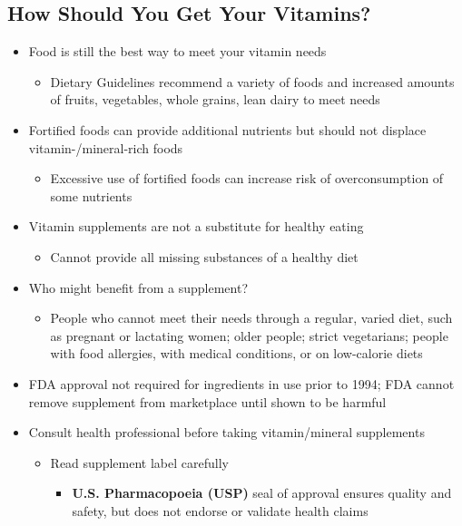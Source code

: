 \documentclass[12pt]{article}
\begin{document}
        \subsection{How Should You Get Your Vitamins?}
            \begin{itemize}
                \item Food is still the best way to meet your vitamin needs
                    \begin{itemize}
                        \item Dietary Guidelines recommend a variety of foods and increased amounts of fruits, vegetables, whole grains, lean dairy to meet needs
                    \end{itemize}
                \item Fortified foods can provide additional nutrients but should not displace vitamin-/mineral-rich foods
                    \begin{itemize}
                        \item Excessive use of fortified foods can increase risk of overconsumption of some nutrients
                    \end{itemize}
                \item Vitamin supplements are not a substitute for healthy eating
                    \begin{itemize}
                        \item Cannot provide all missing substances of a healthy diet
                    \end{itemize}
                \item Who might benefit from a supplement?
                    \begin{itemize}
                        \item People who cannot meet their needs through a regular, varied diet, such as pregnant or lactating women; older people; strict vegetarians; people with food allergies, with medical conditions, or on low-calorie diets
                    \end{itemize}
                \item FDA approval not required for ingredients in use prior to 1994; FDA cannot remove supplement from marketplace until shown to be harmful
                \item Consult health professional before taking vitamin/mineral supplements
                    \begin{itemize}
                        \item Read supplement label carefully
                            \begin{itemize}
                                \item \textbf{U.S. Pharmacopoeia (USP)} seal of approval ensures quality and safety, but does not endorse or validate health claims
                            \end{itemize}
                    \end{itemize}
            \end{itemize}
\end{document}
